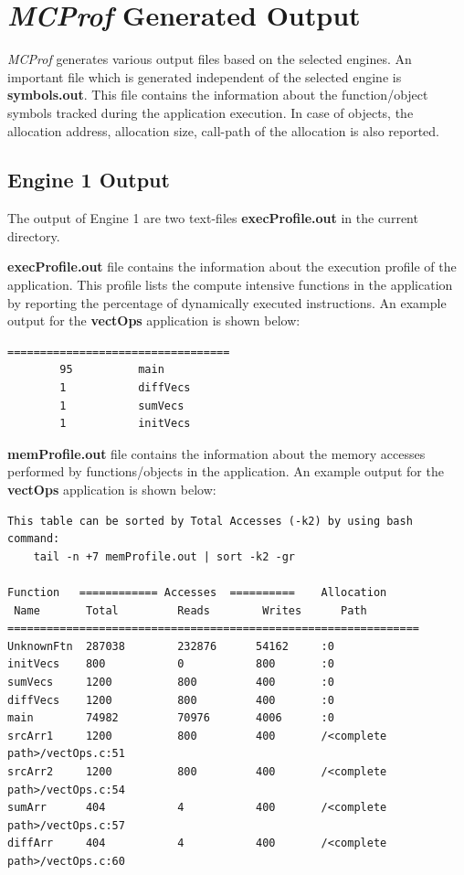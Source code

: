 \documentclass[11pt]{article}
\newcommand{\MCPROF}{\emph{MCProf}}
\begin{document}
\section{\MCPROF{} Generated Output}
\label{sec:output}

\MCPROF{} generates various output files based on the selected engines. An
important file which is generated independent of the selected engine is
\textbf{symbols.out}.  This file contains the information about the
function/object symbols tracked during the application execution. In case of
objects, the allocation address, allocation size, call-path of the allocation is
also reported.

\subsection{Engine 1 Output}

The output of Engine 1 are two text-files \textbf{execProfile.out} in the current
directory.

\textbf{execProfile.out} file contains the information about the
execution profile of the application. This profile lists the compute intensive
functions in the application by reporting the percentage of dynamically executed
instructions. An example output for the \textbf{vectOps} application is shown below:

{
\scriptsize
\begin{Verbatim}[frame=single, samepage=true]
%Exec.Instr.        Function Name
==================================
        95          main
        1           diffVecs
        1           sumVecs
        1           initVecs
\end{Verbatim}
}

\textbf{memProfile.out} file contains the information about the memory accesses
performed by functions/objects in the application. An example output for the
\textbf{vectOps} application is shown below:

{
\scriptsize
\begin{Verbatim}[frame=single, samepage=true]
This table can be sorted by Total Accesses (-k2) by using bash command:
    tail -n +7 memProfile.out | sort -k2 -gr

Function   ============ Accesses  ==========    Allocation
 Name       Total         Reads        Writes      Path
===============================================================
UnknownFtn  287038        232876      54162     :0
initVecs    800           0           800       :0
sumVecs     1200          800         400       :0
diffVecs    1200          800         400       :0
main        74982         70976       4006      :0
srcArr1     1200          800         400       /<complete path>/vectOps.c:51
srcArr2     1200          800         400       /<complete path>/vectOps.c:54
sumArr      404           4           400       /<complete path>/vectOps.c:57
diffArr     404           4           400       /<complete path>/vectOps.c:60
\end{Verbatim}
}
\end{document}
